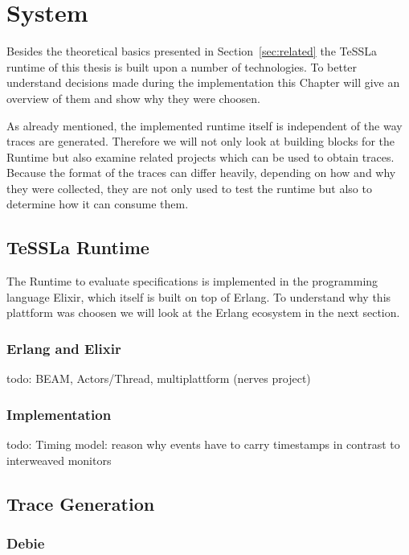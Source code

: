 %
\chapter{System}
\label{sec:system}

Besides the theoretical basics presented in Section~\ref{sec:related} the TeSSLa runtime of this thesis is built upon a number of technologies.
To better understand decisions made during the implementation this Chapter will give an overview of them and show why they were choosen.

As already mentioned, the implemented runtime itself is independent of the way traces are generated.
Therefore we will not only look at building blocks for the Runtime but also examine related projects which can be used to obtain traces.
Because the format of the traces can differ heavily, depending on how and why they were collected, they are not only used to test the runtime but also to determine how it can consume them.

\section{TeSSLa Runtime}
\label{sec:system:runtime}

The Runtime to evaluate specifications is implemented in the programming language Elixir, which itself is built on top of Erlang.
To understand why this plattform was choosen we will look at the Erlang ecosystem in the next section.

\subsection{Erlang and Elixir}
\label{sec:system:eval_engine:erlang_elixir}
todo: BEAM, Actors/Thread, multiplattform (nerves project)

\subsection{Implementation}
todo: Timing model: reason why events have to carry timestamps in contrast to interweaved monitors

\section{Trace Generation}
\label{sec:system:traces}

\subsection{Debie}
